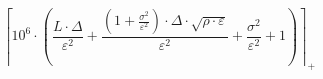 \[\left\lceil 10^{6} \cdot \left(\frac{L \cdot \Delta}{\varepsilon^{2}} + \frac{\left(1 + \frac{\sigma^{2}}{\varepsilon^{2}}\right) \cdot \Delta \cdot \sqrt{\rho \cdot \varepsilon}}{\varepsilon^{2}} + \frac{\sigma^{2}}{\varepsilon^{2}} + 1\right) \right\rceil_{+}\]
